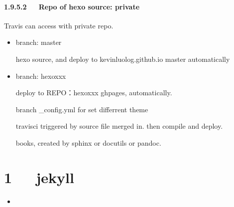 \documentclass[letterpaper,12pt,english]{sphinxmanual}
\begin{document}
\subsubsection{1.9.5.2   Repo of hexo source: private}
\label{\detokenize{001software/001install/001._u7f51_u7ad9/hexo:repo-of-hexo-source-private}}
Travis can access with private repo.
\begin{itemize}
\item {} 
branch: master

hexo source, and deploy to kevinluolog.github.io \sphinxhyphen{} master automatically

\item {} 
branch: hexo\sphinxhyphen{}xxx

deploy to REPO：hexo\sphinxhyphen{}xxx \sphinxhyphen{} gh\sphinxhyphen{}pages, automatically.

branch \_config.yml for set differrent theme

travis\sphinxhyphen{}ci triggered by source file merged in. then compile and deploy.

books, created by sphinx or docutils or pandoc.

\end{itemize}


\chapter{1   jekyll}
\label{\detokenize{001software/001install/001._u7f51_u7ad9/jekyll:jekyll}}\label{\detokenize{001software/001install/001._u7f51_u7ad9/jekyll::doc}}
\begin{sphinxShadowBox}
\begin{itemize}
\item {} 
\label{\detokenize{001software/001install/001._u7f51_u7ad9/jekyll:id2}}{\hyperref[\detokenize{001software/001install/001._u7f51_u7ad9/jekyll:jekyll}]{}}

\end{itemize}
\end{sphinxShadowBox}
\end{document}
